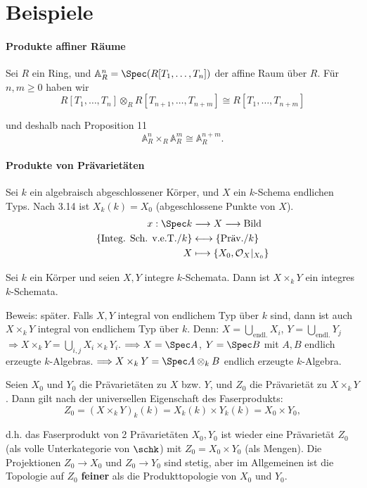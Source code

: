 \section{Beispiele}

\paragraph{Produkte affiner Räume}

Sei $R$ ein Ring, und $\mathbb{A}_{R}^{n}=\Spec(R[T_{1},\ldots,T_{n}])$
der affine Raum über $R$. Für $n,m\geq0$ haben wir 
\[
  R[T_{1},\ldots,T_{n}]\otimes_{R}R[T_{n+1},\ldots,T_{n+m}]\cong R[T_{1},\ldots,T_{n+m}]
\]

und deshalb nach Proposition 11
\[
  \mathbb{A}_{R}^{n}\times_{R}\mathbb{A}_{R}^{m}\cong\mathbb{A}_{R}^{n+m}.
\]


\paragraph{Produkte von Prävarietäten}

Sei $k$ ein algebraisch abgeschlossener Körper, und $X$ ein $k$-Schema
endlichen Typs. Nach 3.14 ist $X_{k}(k)=X_{0}$ (abgeschlossene Punkte
von $X$).
\begin{align*}
  x:\Spec k & \longrightarrow X\longrightarrow\text{Bild}\\
  \text{\{Integ. Sch. v.e.T./}k\} & \longleftrightarrow\text{\{Präv./}k\}\\
  X & \longmapsto\{X_{0},\mathcal{O}_{X}|_{X_{0}}\}
\end{align*}

\begin{lem}[15]
  Sei $k$ ein Körper und seien $X,Y$ integre $k$-Schemata. Dann
  ist $X\times_{k}Y$ ein integres $k$-Schemata.
\end{lem}

Beweis: später. Falls $X,Y$ integral von endlichem Typ über $k$
sind, dann ist auch $X\times_{k}Y$ integral von endlichem Typ über
$k$. Denn: $X=\bigcup_{\text{endl.}}X_{i}$, $Y=\bigcup_{\text{endl.}}Y_{j}$
$\Longrightarrow X\times_{k}Y=\bigcup_{i,j}X_{i}\times_{k}Y_{i}$.
$\Longrightarrow X=\Spec A$, $Y=\Spec B$ mit $A,B$ endlich erzeugte
$k$-Algebras. $\Longrightarrow X\times_{k}Y=\Spec A\otimes_{k}B$
endlich erzeugte $k$-Algebra.\medskip{}

Seien $X_{0}$ und $Y_{0}$ die Prävarietäten zu $X$ bzw. $Y$, und
$Z_{0}$ die Prävarietät zu $X\times_{k}Y$. Dann gilt nach der universellen
Eigenschaft des Faserprodukts:
\[
  Z_{0}=(X\times_{k}Y)_{k}(k)=X_{k}(k)\times Y_{k}(k)=X_{0}\times Y_{0},
\]

d.h. das Faserprodukt von 2 Prävarietäten $X_{0},Y_{0}$ ist wieder
eine Prävarietät $Z_{0}$ (als volle Unterkategorie von $\schk$)
mit $Z_{0}=X_{0}\times Y_{0}$ (als Mengen). Die Projektionen $Z_{0}\rightarrow X_{0}$
und $Z_{0}\rightarrow Y_{0}$ sind stetig, aber im Allgemeinen ist
die Topologie auf $Z_{0}$ \textbf{feiner }als die Produkttopologie
von $X_{0}$ und $Y_{0}$.
